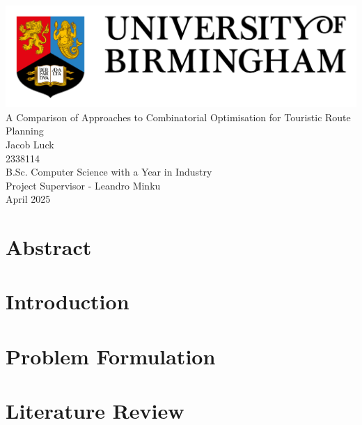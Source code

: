 \documentclass[a4paper,12pt]{article}
\begin{document}
    \begin{titlepage}
        \centering
        \includegraphics[width = 1\textwidth]{UoB_Logo}\\[10ex]
        \Huge{A Comparison of Approaches to Combinatorial Optimisation for Touristic Route Planning}\\[14ex]
        \LARGE{Jacob Luck}\\
        \large{2338114}\\[2ex]
        \Large{B.Sc. Computer Science with a Year in Industry}\\
        \Large{Project Supervisor - Leandro Minku}\\[2ex]
        \large{April 2025}
    \end{titlepage}

    \tableofcontents

    \pagebreak

    \section*{Abstract}\label{sec:abstract}

    \section{Introduction}\label{sec:introduction}

    \pagebreak
    
    \section{Problem Formulation}\label{sec:problem-formulation}
    

    \pagebreak

    \section{Literature Review}\label{sec:literature-review}
\end{document}
